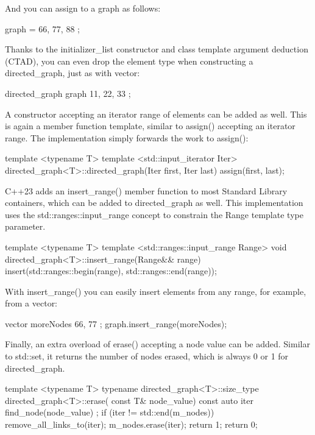 And you can assign to a graph as follows:

\begin{cpp}
graph = { 66, 77, 88 };
\end{cpp}

Thanks to the initializer\_list constructor and class template argument deduction (CTAD), you can even drop the element type when constructing a directed\_graph, just as with vector:

\begin{cpp}
directed_graph graph { 11, 22, 33 };
\end{cpp}

A constructor accepting an iterator range of elements can be added as well. This is again a member function template, similar to assign() accepting an iterator range. The implementation simply forwards the work to assign():

\begin{cpp}
template <typename T>
template <std::input_iterator Iter>
directed_graph<T>::directed_graph(Iter first, Iter last)
{
    assign(first, last);
}
\end{cpp}

C++23 adds an insert\_range() member function to most Standard Library containers, which can be added to directed\_graph as well. This implementation uses the std::ranges::input\_range concept to constrain the Range template type parameter.

\begin{cpp}
template <typename T>
template <std::ranges::input_range Range>
void directed_graph<T>::insert_range(Range&& range)
{
    insert(std::ranges::begin(range), std::ranges::end(range));
}
\end{cpp}

With insert\_range() you can easily insert elements from any range, for example, from a vector:

\begin{cpp}
vector moreNodes { 66, 77 };
graph.insert_range(moreNodes);
\end{cpp}

Finally, an extra overload of erase() accepting a node value can be added. Similar to std::set, it returns the number of nodes erased, which is always 0 or 1 for directed\_graph.

\begin{cpp}
template <typename T>
typename directed_graph<T>::size_type directed_graph<T>::erase(
    const T& node_value)
{
    const auto iter { find_node(node_value) };
    if (iter != std::end(m_nodes)) {
        remove_all_links_to(iter);
        m_nodes.erase(iter);
        return 1;
    }
    return 0;
}
\end{cpp}

